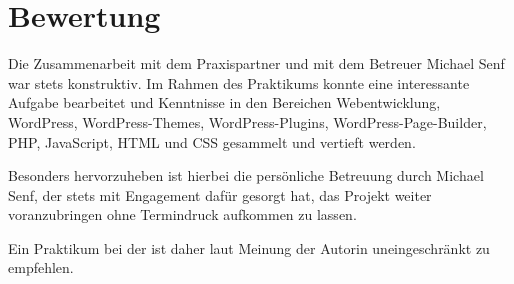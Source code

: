 \section{Bewertung}


Die Zusammenarbeit mit dem Praxispartner und mit dem Betreuer Michael Senf war stets konstruktiv. Im Rahmen des Praktikums konnte eine interessante Aufgabe bearbeitet und Kenntnisse in den Bereichen Webentwicklung, WordPress, WordPress-Themes, WordPress-Plugins, WordPress-Page-Builder, PHP, JavaScript, HTML und CSS gesammelt und vertieft werden.

Besonders hervorzuheben ist hierbei die persönliche Betreuung durch Michael Senf, der stets mit Engagement dafür gesorgt hat, das Projekt weiter voranzubringen ohne Termindruck aufkommen zu lassen.

Ein Praktikum bei der  ist daher laut Meinung der Autorin uneingeschränkt zu empfehlen.

